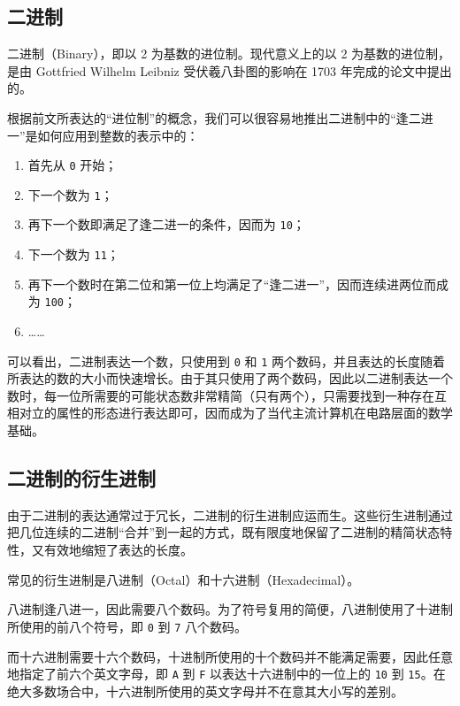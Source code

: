     \subsection{二进制}\label{subsec:NumberSystemBasics/positional-notation/binary}
        二进制（Binary），即以 2 为基数的进位制。现代意义上的以 2 为基数的进位制，是由 Gottfried Wilhelm Leibniz 受伏羲八卦图的影响在 1703 年完成的论文\cite{leibniz-binary}中提出的。

        根据前文所表达的“进位制”的概念，我们可以很容易地推出二进制中的“逢二进一”是如何应用到整数的表示中的：
        \begin{enumerate}[start = 0]
            \item 首先从 \texttt{0} 开始；
            \item 下一个数为 \texttt{1}；
            \item 再下一个数即满足了逢二进一的条件，因而为 \texttt{10}；
            \item 下一个数为 \texttt{11}；
            \item 再下一个数时在第二位和第一位上均满足了“逢二进一”，因而连续进两位而成为 \texttt{100}；
            \item ……
        \end{enumerate}

        可以看出，二进制表达一个数，只使用到 \texttt{0} 和 \texttt{1} 两个数码，并且表达的长度随着所表达的数的大小而快速增长。由于其只使用了两个数码，因此以二进制表达一个数时，每一位所需要的可能状态数非常精简（只有两个），只需要找到一种存在互相对立的属性的形态进行表达即可，因而成为了当代主流计算机在电路层面的数学基础。
    \subsection{二进制的衍生进制}\label{subsec:NumberSystemBasics/positional-notation/binary-derivation}
        由于二进制的表达通常过于冗长，二进制的衍生进制应运而生。这些衍生进制通过把几位连续的二进制“合并”到一起的方式，既有限度地保留了二进制的精简状态特性，又有效地缩短了表达的长度。

        常见的衍生进制是八进制（Octal）和十六进制（Hexadecimal）。

        八进制逢八进一，因此需要八个数码。为了符号复用的简便，八进制使用了十进制所使用的前八个符号，即 \texttt{0} 到 \texttt{7} 八个数码。

        而十六进制需要十六个数码，十进制所使用的十个数码并不能满足需要，因此任意地指定了前六个英文字母，即 \texttt{A} 到 \texttt{F} 以表达十六进制中的一位上的 \texttt{10} 到 \texttt{15}。在绝大多数场合中，十六进制所使用的英文字母并不在意其大小写的差别。
